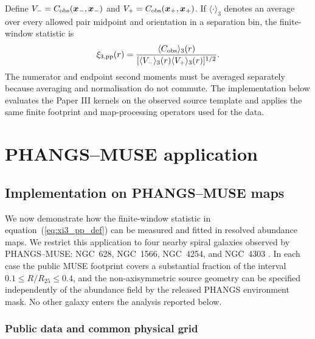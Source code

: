 \documentclass[fleqn,usenatbib]{mnras}
\newcommand{\bs}[1]{\boldsymbol{#1}}
\begin{document}
Define $V_-=C_{\rm obs}(\bs{x}_-,\bs{x}_-)$ and $V_+=C_{\rm obs}(\bs{x}_+,\bs{x}_+)$.  If $\langle\cdot\rangle_3$ denotes an average over every allowed pair midpoint and orientation in a separation bin, the finite-window statistic is
\begin{equation}
    \xi_{3,{\rm pp}}(r)
    =\frac{\langle C_{\rm obs}\rangle_3(r)}
    {[\langle V_-\rangle_3(r)\langle V_+\rangle_3(r)]^{1/2}}.
    \label{eq:xi3_pp_def}
\end{equation}
The numerator and endpoint second moments must be averaged separately because averaging and normalisation do not commute.  The implementation below evaluates the Paper III kernels on the observed source template and applies the same finite footprint and map-processing operators used for the data.

\section{PHANGS--MUSE application}
\label{sec:application}

\subsection{Implementation on PHANGS--MUSE maps}
\label{ssec:phangs_implementation}

We now demonstrate how the finite-window statistic in equation~(\ref{eq:xi3_pp_def}) can be measured and fitted in resolved abundance maps.  We restrict this application to four nearby spiral galaxies observed by PHANGS--MUSE: NGC~628, NGC~1566, NGC~4254, and NGC~4303 \citep{2022A&A...659A.191E}.  In each case the public MUSE footprint covers a substantial fraction of the interval $0.1\leq R/R_{25}\leq0.4$, and the non-axisymmetric source geometry can be specified independently of the abundance field by the released PHANGS environment mask.  No other galaxy enters the analysis reported below.

\subsubsection{Public data and common physical grid}
\label{sssec:phangs_data}
\end{document}
